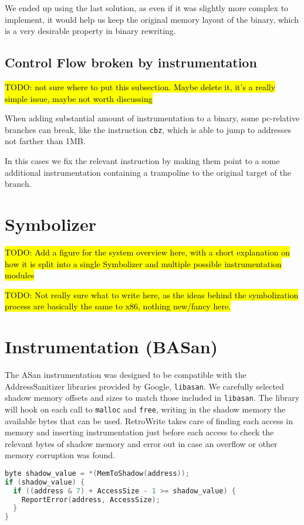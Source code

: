 \documentclass[a4paper,11pt,oneside]{report}
\newcommand{\sysname}{RetroWrite\xspace}
\newcommand{\todo}[1]{%
	\begingroup 
	\sethlcolor{cyan}%
	\hl{TODO: #1}%
	\endgroup
}
\begin{document}
We ended up using the last solution, as even if it was slightly more complex to 
implement, it would help us keep the original memory layout of the binary, 
which is a very desirable property in binary rewriting. 

\subsection{Control Flow broken by instrumentation}
\todo{not sure where to put this subsection. Maybe delete it, it's a really 
simple issue, maybe not worth discussing}
When adding substantial amount of instrumentation to a binary, some pc-relative 
branches can break, like the instruction \texttt{cbz}, which is able to jump to 
addresses not farther than 1MB. 

In this cases we fix the relevant instruction by making them point to a some 
additional instrumentation containing a trampoline to the original target of 
the branch. 


\section{Symbolizer}
\todo{Add a figure for the system overview here, with a short explanation on 
how it is split into a single Symbolizer and multiple possible instrumentation 
modules}

\todo{Not really sure what to write here, as the ideas behind the symbolization 
process are basically the same to x86, nothing new/fancy here.}




\section{Instrumentation (BASan)}
The ASan instrumentation was designed to be compatible with the 
AddressSanitizer libraries provided by Google, \texttt{libasan}. We carefully 
selected shadow memory offsets and sizes to match those included in 
\texttt{libasan}.  The library will hook on each call to \texttt{malloc} and 
\texttt{free}, writing in the shadow memory the available bytes that can be 
used. \sysname takes care of finding each access in memory and inserting 
instrumentation just before each access to check the relevant bytes of shadow 
memory and error out in case an overflow or other memory corruption was found.


\begin{lstlisting}[language=C,label={lst:asan},caption={ASan checking algorithm 
implemented in C}]
byte shadow_value = *(MemToShadow(address));
if (shadow_value) {
  if ((address & 7) + AccessSize - 1 >= shadow_value) {
	ReportError(address, AccessSize);
  }
}
\end{lstlisting}
\end{document}
